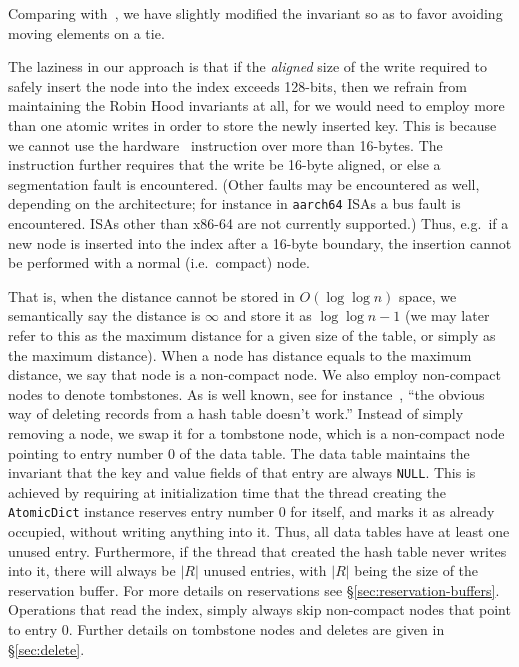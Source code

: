 Comparing with~\cite{robin-hood}, we have slightly modified the invariant so as to favor avoiding moving elements on a tie.

The laziness in our approach is that if the \emph{aligned} size of the write required to safely insert the node into the index exceeds 128-bits, then we refrain from maintaining the Robin Hood invariants at all, for we would need to employ more than one atomic writes in order to store the newly inserted key.
This is because we cannot use the hardware~\cite[CMPXCHG--Compare and Exchange]{x86-64} instruction over more than 16-bytes.
The instruction further requires that the write be 16-byte aligned, or else a segmentation fault is encountered.
(Other faults may be encountered as well, depending on the architecture; for instance in \texttt{aarch64} ISAs a bus fault is encountered.
ISAs other than x86-64 are not currently supported.)
Thus, e.g.\ if a new node is inserted into the index after a 16-byte boundary, the insertion cannot be performed with a normal (i.e.\ compact) node.

That is, when the distance cannot be stored in $O(\log \log n)$ space, we semantically say the distance is $\infty$ and store it as $\log \log n - 1$ (we may later refer to this as the maximum distance for a given size of the table, or simply as the maximum distance).
When a node has distance equals to the maximum distance, we say that node is a non-compact node.
We also employ non-compact nodes to denote tombstones.
As is well known, see for instance~\cite[\S6.4]{the-art-vol-2}, ``the obvious way of deleting records from a hash table doesn't work.''
Instead of simply removing a node, we swap it for a tombstone node, which is a non-compact node pointing to entry number 0 of the data table.
The data table maintains the invariant that the key and value fields of that entry are always \texttt{NULL}.
This is achieved by requiring at initialization time that the thread creating the \texttt{AtomicDict} instance reserves entry number 0 for itself, and marks it as already occupied, without writing anything into it.
Thus, all data tables have at least one unused entry.
Furthermore, if the thread that created the hash table never writes into it, there will always be $|R|$ unused entries, with $|R|$ being the size of the reservation buffer.
For more details on reservations see \S\ref{sec:reservation-buffers}.
Operations that read the index, simply always skip non-compact nodes that point to entry 0.
Further details on tombstone nodes and deletes are given in \S\ref{sec:delete}.

